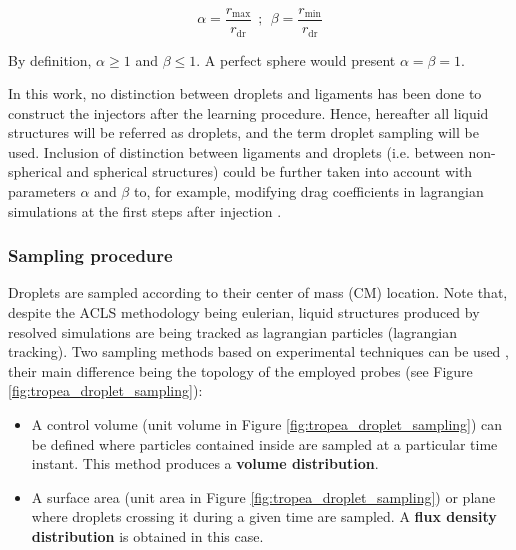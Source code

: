 \begin{equation}
\label{eq:ch4_deformation_parameters_alpha_beta_calculation}
\alpha = \frac{r_\mathrm{max}}{r_\mathrm{dr}} ~~ ; ~~ \beta = \frac{r_\mathrm{min}}{r_\mathrm{dr}}
\end{equation}	

By definition, $\alpha \geq 1$ and $\beta \leq 1$. A perfect sphere would present $\alpha = \beta = 1$.

In this work, no distinction between droplets and ligaments has been done to construct the injectors after the learning procedure. Hence, hereafter all liquid structures will be referred as droplets, and the term droplet sampling will be used. Inclusion of distinction between ligaments and droplets (i.e. between non-spherical and spherical structures) could be further taken into account with parameters $\alpha$ and $\beta$ to, for example, modifying drag coefficients in lagrangian simulations at the first steps after injection . 


\subsubsection*{Sampling procedure}

Droplets are sampled according to their center of mass (CM) location. Note that, despite the ACLS methodology being eulerian, liquid structures produced by resolved simulations are being tracked as lagrangian particles (lagrangian tracking). Two sampling methods based on experimental techniques can be used , their main difference being the topology of the employed probes (see Figure \ref{fig:tropea_droplet_sampling}):

\begin{itemize}

	\item A control volume (unit volume in Figure \ref{fig:tropea_droplet_sampling}) can be defined where particles contained inside are sampled at a particular time instant. This method produces a \textbf{volume distribution}. 
	
	\item A surface area (unit area in Figure \ref{fig:tropea_droplet_sampling}) or plane where droplets crossing it during a given time are sampled. A \textbf{flux density distribution} is obtained in this case.

\end{itemize}


